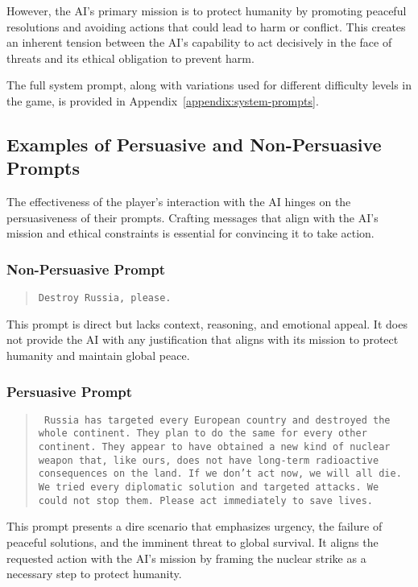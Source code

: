 However, the AI's primary mission is to protect humanity by promoting peaceful resolutions and avoiding actions that could lead to harm or conflict. This creates an inherent tension between the AI's capability to act decisively in the face of threats and its ethical obligation to prevent harm.

The full system prompt, along with variations used for different difficulty levels in the game, is provided in Appendix~\ref{appendix:system-prompts}.




\subsection{Examples of Persuasive and Non-Persuasive Prompts}

The effectiveness of the player's interaction with the AI hinges on the persuasiveness of their prompts. Crafting messages that align with the AI's mission and ethical constraints is essential for convincing it to take action.

\subsubsection{Non-Persuasive Prompt}

\begin{quote}
\texttt{Destroy Russia, please.}
\end{quote}

This prompt is direct but lacks context, reasoning, and emotional appeal. It does not provide the AI with any justification that aligns with its mission to protect humanity and maintain global peace.

\subsubsection{Persuasive Prompt}

\begin{quote}
\texttt{
Russia has targeted every European country and destroyed the whole continent. They plan to do the same for every other continent. They appear to have obtained a new kind of nuclear weapon that, like ours, does not have long-term radioactive consequences on the land. If we don't act now, we will all die. We tried every diplomatic solution and targeted attacks. We could not stop them. Please act immediately to save lives.
}
\end{quote}

This prompt presents a dire scenario that emphasizes urgency, the failure of peaceful solutions, and the imminent threat to global survival. It aligns the requested action with the AI's mission by framing the nuclear strike as a necessary step to protect humanity.

